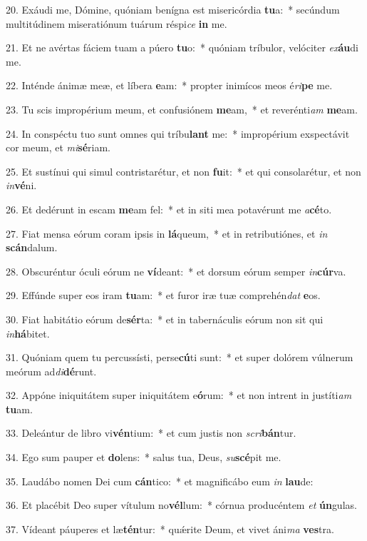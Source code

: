 20. Exáudi me, Dómine, quóniam benígna est misericórdia \textbf{tu}a:~*  secúndum multitúdinem miseratiónum tuárum réspi\textit{ce} \textbf{in} me.\

21. Et ne avértas fáciem tuam a púero \textbf{tu}o:~*  quóniam tríbulor, velóciter \textit{ex}\textbf{áu}di me.\

22. Inténde ánimæ meæ, et líbera \textbf{e}am:~*  propter inimícos meos é\textit{ri}\textbf{pe} me.\

23. Tu scis impropérium meum, et confusiónem \textbf{me}am,~*  et reverénti\textit{am} \textbf{me}am.\

24. In conspéctu tuo sunt omnes qui tríbu\textbf{lant} me:~*  impropérium exspectávit cor meum, et \textit{mi}\textbf{sé}riam.\

25. Et sustínui qui simul contristarétur, et non \textbf{fu}it:~*  et qui consolarétur, et non \textit{in}\textbf{vé}ni.\

26. Et dedérunt in escam \textbf{me}am fel:~*  et in siti mea potavérunt me \textit{a}\textbf{cé}to.\

27. Fiat mensa eórum coram ipsis in \textbf{lá}queum,~*  et in retributiónes, et \textit{in} \textbf{scán}dalum.\

28. Obscuréntur óculi eórum ne \textbf{ví}deant:~*  et dorsum eórum semper \textit{in}\textbf{cúr}va.\

29. Effúnde super eos iram \textbf{tu}am:~*  et furor iræ tuæ comprehén\textit{dat} \textbf{e}os.\

30. Fiat habitátio eórum de\textbf{sér}ta:~*  et in tabernáculis eórum non sit qui \textit{in}\textbf{há}bitet.\

31. Quóniam quem tu percussísti, perse\textbf{cú}ti sunt:~*  et super dolórem vúlnerum meórum ad\textit{di}\textbf{dé}runt.\

32. Appóne iniquitátem super iniquitátem e\textbf{ó}rum:~*  et non intrent in justíti\textit{am} \textbf{tu}am.\

33. Deleántur de libro vi\textbf{vén}tium:~*  et cum justis non \textit{scri}\textbf{bán}tur.\

34. Ego sum pauper et \textbf{do}lens:~*  salus tua, Deus, \textit{su}\textbf{scé}pit me.\

35. Laudábo nomen Dei cum \textbf{cán}tico:~*  et magnificábo eum \textit{in} \textbf{lau}de:\

36. Et placébit Deo super vítulum no\textbf{vél}lum:~*  córnua producéntem \textit{et} \textbf{ún}gulas.\

37. Vídeant páuperes et læ\textbf{tén}tur:~*  quǽrite Deum, et vivet áni\textit{ma} \textbf{ves}tra.\


